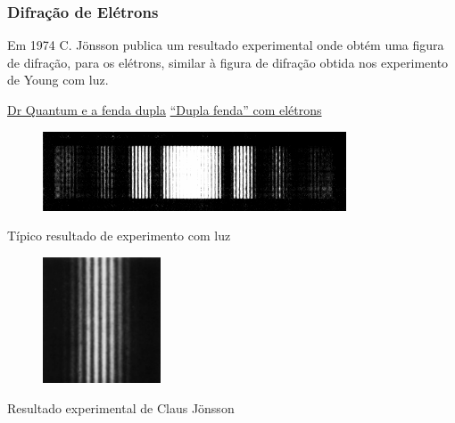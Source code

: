 \documentclass[12pt,brazil]{beamer}
\begin{document}
    
\begin{frame}
  \frametitle{Difração de Elétrons}
  \begin{multicols}{2}
    \begin{minipage}[b][20ex][t]{\linewidth}
    \vspace*{1cm}
      
        \fontsize{9pt}{11pt}\selectfont
        Em 1974 C. Jönsson publica um resultado experimental onde obtém uma figura de difração, para os elétrons, similar à figura de difração obtida nos experimento de Young com luz.\newline
        
        \href{https://www.youtube.com/watch?v=UtPf0XYQzfI}{\fontsize{7pt}{11pt}\selectfont \color{blue} Dr Quantum e a fenda dupla} \newline
        \href{https://www.youtube.com/watch?v=ZJ-0PBRuthc}{\fontsize{7pt}{11pt}\selectfont \color{blue} ``Dupla fenda'' com elétrons}
      
    \end{minipage}

    \begin{minipage}[b][20ex][t]{\linewidth}
    \vspace*{0.0cm}
      \begin{figure}
        \hspace*{1.25cm}\includegraphics[width=9cm]{figuras/fig13}
      \end{figure}
        \fontsize{7pt}{11pt}\selectfont
      \vspace*{-0.50cm}Típico resultado de experimento com luz
    \end{minipage}

    \begin{minipage}[b][40ex][t]{\linewidth} 
      \begin{figure}
        \includegraphics[width=3.5cm]{figuras/fig14}
      \end{figure}
        \fontsize{7pt}{11pt}\selectfont      
    \vspace*{-0.50cm}Resultado experimental de Claus Jönsson
    \end{minipage}
  \end{multicols}
    

\end{frame}
\end{document}
